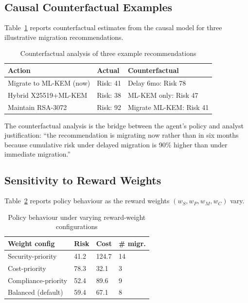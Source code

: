 \documentclass[sigconf,nonacm]{acmart}
\begin{document}
\subsection{Causal Counterfactual Examples}

Table~\ref{tab:counterfactual} reports counterfactual estimates from
the causal model for three illustrative migration recommendations.

\begin{table}[h]
\caption{Counterfactual analysis of three example recommendations}
\label{tab:counterfactual}
\small
\begin{tabularx}{\columnwidth}{@{}p{2.4cm}X X@{}}
\toprule
\textbf{Action} & \textbf{Actual} & \textbf{Counterfactual} \\
\midrule
Migrate to ML-KEM (now)   & Risk: 41 & Delay 6mo: Risk 78 \\
Hybrid X25519+ML-KEM      & Risk: 38 & ML-KEM only: Risk 47 \\
Maintain RSA-3072         & Risk: 92 & Migrate ML-KEM: Risk 41 \\
\bottomrule
\end{tabularx}
\end{table}

The counterfactual analysis is the bridge between the agent's policy
and analyst justification: ``the recommendation is migrating now
rather than in six months because cumulative risk under delayed
migration is 90\% higher than under immediate migration.''

\subsection{Sensitivity to Reward Weights}

Table~\ref{tab:weights} reports policy behaviour as the reward
weights $(w_S, w_P, w_M, w_C)$ vary.

\begin{table}[h]
\caption{Policy behaviour under varying reward-weight configurations}
\label{tab:weights}
\small
\begin{tabularx}{\columnwidth}{@{}p{2.4cm}X X X@{}}
\toprule
\textbf{Weight config} & \textbf{Risk} & \textbf{Cost} & \textbf{\# migr.} \\
\midrule
Security-priority      & 41.2  & 124.7 & 14 \\
Cost-priority          & 78.3  & 32.1  & 3 \\
Compliance-priority    & 52.4  & 89.6  & 9 \\
Balanced (default)     & 59.4  & 67.1  & 8 \\
\bottomrule
\end{tabularx}
\end{table}
\end{document}
